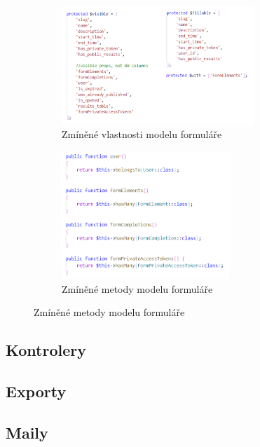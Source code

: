	\begin{figure}[H]
		\begin{figure}[H]
			\centering
			\includegraphics[width=0.8\textwidth]{img/form_model/vlastnosti.png}
			\caption{Zmíněné vlastnosti modelu formuláře}
			\label{fig:model_vlastnosti}
		\end{figure}
		
		\begin{figure}[H]
			\centering
			\includegraphics[width=0.7\textwidth]{img/form_model/metody.png}
			\caption{Zmíněné metody modelu formuláře}
			\label{fig:model_metody}
		\end{figure}
	\end{figure}
	
	
	
			
	\subsection{Kontrolery}
	
	
	\subsection{Exporty}
	
	\subsection{Maily}
	
